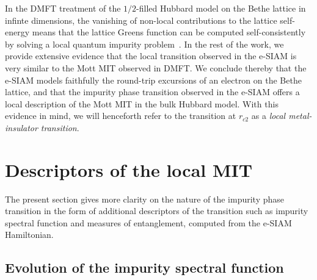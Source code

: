 \documentclass{iopart}
\begin{document}
In the DMFT treatment of the $1/2$-filled Hubbard model on the Bethe lattice in infinte dimensions, the vanishing of non-local contributions to the lattice self-energy means that the lattice Greens function can be computed self-consistently by solving a local quantum impurity problem~\cite{georges1996}. In the rest of the work, we provide extensive evidence that the local transition observed in the e-SIAM is very similar to the Mott MIT observed in DMFT. We conclude thereby that the e-SIAM models faithfully the round-trip excursions of an electron on the Bethe lattice, and that the impurity phase transition observed in the e-SIAM offers a local description of the Mott MIT in the bulk Hubbard model. With this evidence in mind, we will henceforth refer to the transition at \(r_{c2}\) as a {\it local metal-insulator transition}.

\section{Descriptors of the local MIT}
\label{desc-mit}

The present section gives more clarity on the nature of the impurity phase transition in the form of additional descriptors of the transition such as impurity spectral function and measures of entanglement, computed from the e-SIAM Hamiltonian.
\subsection{Evolution of the impurity spectral function}
\end{document}
